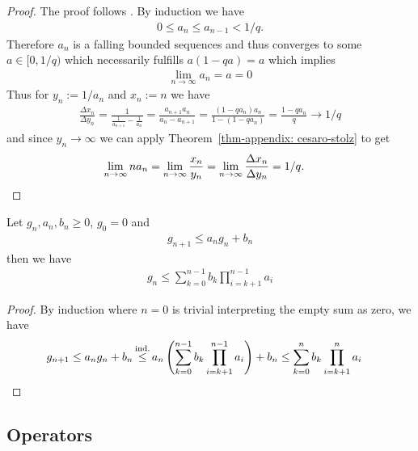 \begin{proof}
	The proof follows \textcite{israelHowWorkOut2012}. By induction we have
	\begin{align*}
		0\le a_n \le a_{n-1} < 1/q.
	\end{align*}
	Therefore \(a_n\) is a falling bounded sequences and thus converges to
	some \(a\in[0,1/q)\) which necessarily fulfills
		\(a(1-qa) = a\)
	which implies
	\begin{align*}
		\lim_{n\to\infty} a_n = a = 0
	\end{align*}
	Thus for \(y_n := 1/a_n\) and \(x_n:=n\) we have
	\begin{align*}
		\frac{\Delta x_n}{\Delta y_n}
		= \frac{1}{\frac{1}{a_{n+1}}-\frac1{a_n}}
		= \frac{a_{n+1}a_n}{a_n - a_{n+1}}
		= \frac{(1-q a_n)a_n}{1 - (1-q a_n)}
		= \frac{1-q a_n}{q} \to 1/q
	\end{align*}
	and since \(y_n\to\infty\) we can apply Theorem~\ref{thm-appendix: cesaro-stolz}
	to get
	\begin{align*}
		\lim_{n\to\infty} n a_n
		&= \lim_{n\to\infty} \frac{x_n}{y_n}
		= \lim_{n\to\infty} \frac{\Delta x_n}{\Delta y_n}
		= 1/q.
		\qedhere
	\end{align*}
\end{proof}

\begin{lemma}\label{lem-appendix: discrete gronwall}
	Let \(g_n, a_n, b_n \ge 0\), \(g_0=0\) and
	\begin{align*}
		g_{n+1} \le a_n g_n + b_n
	\end{align*}
	then we have
	\begin{align*}
		g_n \le \sum_{k=0}^{n-1}b_k\prod_{i=k+1}^{n-1}a_i
	\end{align*}
\end{lemma}
\begin{proof}
	By induction where \(n=0\) is trivial interpreting the empty sum as zero, we have	
	\begin{align*}
		g_{n+1}
		&\le a_n g_n + b_n
		\xle{\text{ind.}} a_n \left(\sum_{k=0}^{n-1}b_k\prod_{i=k+1}^{n-1}a_i\right) + b_n
		\le \sum_{k=0}^{n}b_k\prod_{i=k+1}^{n}a_i
		\qedhere
	\end{align*}
\end{proof}

\subsection{Operators}

